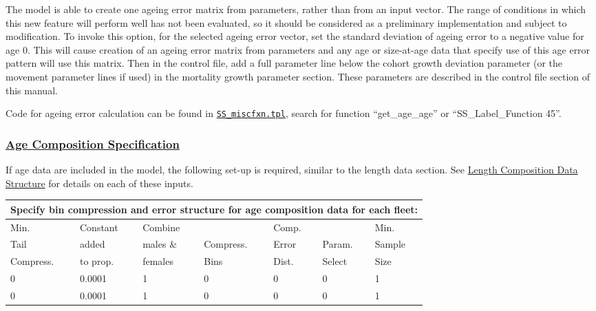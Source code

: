 The model is able to create one ageing error matrix from parameters, rather than from an input vector. The range of conditions in which this new feature will perform well has not been evaluated, so it should be considered as a preliminary implementation and subject to modification. To invoke this option, for the selected ageing error vector, set the standard deviation of ageing error to a negative value for age 0. This will cause creation of an ageing error matrix from parameters and any age or size-at-age data that specify use of this age error pattern will use this matrix. Then in the control file, add a full parameter line below the cohort growth deviation parameter (or the movement parameter lines if used) in the mortality growth parameter section. These parameters are described in the control file section of this manual.

Code for ageing error calculation can be found in \href{https://github.com/nmfs-ost/ss3-source-code/blob/main/SS_miscfxn.tpl}{\texttt{SS\_miscfxn.tpl}}, search for function ``get\_age\_age'' or ``SS\_Label\_Function 45''.

\hypertarget{AgeCompSpec}{}
\subsubsection[Age Composition Specification]{\protect\hyperlink{AgeCompSpec}{Age Composition Specification}}
If age data are included in the model, the following set-up is required, similar to the length data section. See \hyperlink{length-comp-structure}{Length Composition Data Structure} for details on each of these inputs.

\begin{tabular}{p{2cm} p{2cm} p{2cm} p{1.5cm} p{1.5cm} p{2cm} p{2cm}}
	\multicolumn{7}{l}{Specify bin compression and error structure for age composition data for each fleet:} \\
	\hline
	Min.      & Constant & Combine  &           & Comp. &        & Min. \Tstrut\\
	Tail      & added    & males \& & Compress. & Error & Param. & Sample \\
	Compress. & to prop. & females  & Bins      & Dist. & Select & Size \Bstrut\\
	\hline
	0 & 0.0001 & 1 & 0 & 0 & 0 & 1 \Tstrut\\
	0 & 0.0001 & 1 & 0 & 0 & 0 & 1 \Bstrut\\
	\hline
\end{tabular}
\leavevmode\tagmcend\tagstructend\par

